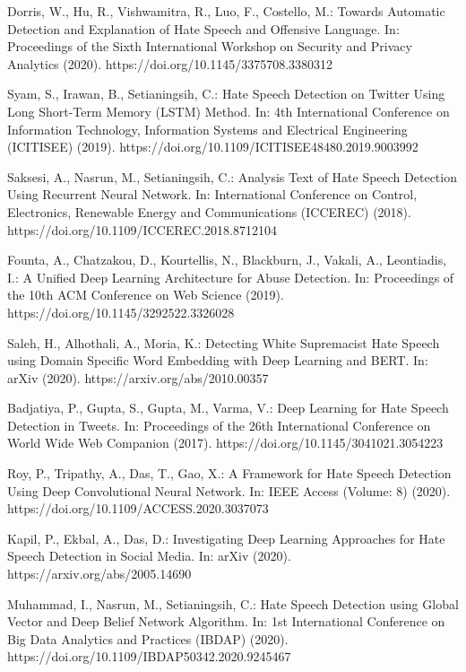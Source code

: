 \documentclass[
     12pt,         %
     a4paper,      %
     BCOR10mm,     %
     DIV14,        %
     ]{article}
\begin{document}








\newpage

% 
\begin{thebibliography}{9}
	
 Dorris, W., Hu, R., Vishwamitra, R., Luo, F., Costello, M.: Towards Automatic Detection and Explanation of Hate Speech and Offensive Language.
In: Proceedings of the Sixth International Workshop on Security and Privacy Analytics (2020).
https://doi.org/10.1145/3375708.3380312

 Syam, S., Irawan, B., Setianingsih, C.: Hate Speech Detection on Twitter Using Long Short-Term Memory (LSTM) Method.
In: 4th International Conference on Information Technology, Information Systems and Electrical Engineering (ICITISEE) (2019).
https://doi.org/10.1109/ICITISEE48480.2019.9003992

 Saksesi, A., Nasrun, M., Setianingsih, C.: Analysis Text of Hate Speech Detection Using Recurrent Neural
Network.
In: International Conference on Control, Electronics, Renewable Energy and Communications (ICCEREC) (2018).
https://doi.org/10.1109/ICCEREC.2018.8712104

 Founta, A., Chatzakou, D., Kourtellis, N., Blackburn, J., Vakali, A., Leontiadis, I.: A Unified Deep Learning Architecture for Abuse Detection.
In: Proceedings of the 10th ACM Conference on Web Science (2019).
https://doi.org/10.1145/3292522.3326028

 Saleh, H., Alhothali, A., Moria, K.: Detecting White Supremacist Hate Speech using Domain Specific Word Embedding with Deep Learning and BERT.
In: arXiv (2020).
https://arxiv.org/abs/2010.00357

 Badjatiya, P., Gupta, S., Gupta, M., Varma, V.: Deep Learning for Hate Speech Detection in Tweets.
In: Proceedings of the 26th International Conference on World Wide Web Companion (2017).
https://doi.org/10.1145/3041021.3054223

 Roy, P., Tripathy, A., Das, T., Gao, X.: A Framework for Hate Speech Detection Using Deep Convolutional Neural Network.
In: IEEE Access (Volume: 8) (2020).
https://doi.org/10.1109/ACCESS.2020.3037073

 Kapil, P., Ekbal, A., Das, D.: Investigating Deep Learning Approaches for Hate Speech Detection in Social Media.
In: arXiv (2020).
https://arxiv.org/abs/2005.14690

 Muhammad, I., Nasrun, M., Setianingsih, C.: Hate Speech Detection using Global Vector and Deep Belief Network Algorithm.
In: 1st International Conference on Big Data Analytics and Practices (IBDAP) (2020).
https://doi.org/10.1109/IBDAP50342.2020.9245467

\end{thebibliography}
\end{document}
